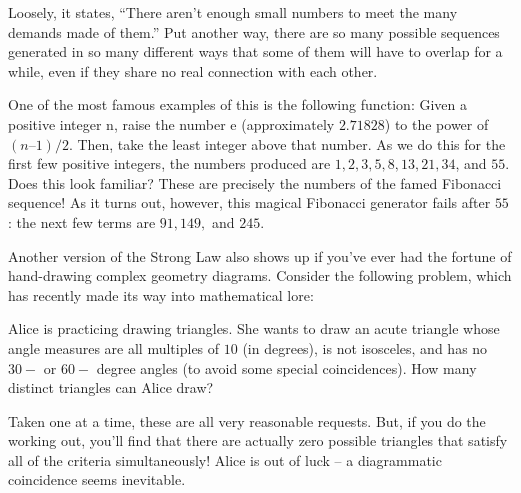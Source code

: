 \documentclass{article}
\begin{document}
Loosely, it states, “There aren’t enough small numbers to meet the many demands made of them.” Put another way, there are so many possible sequences generated in so many different ways that some of them will have to overlap for a while, even if they share no real connection with each other.
	
One of the most famous examples of this is the following function: Given a positive integer n, raise the number e (approximately $2.71828$) to the power of $(n – 1)/2$. Then, take the least integer above that number. As we do this for the first few positive integers, the numbers produced are $1, 2, 3, 5, 8, 13, 21, 34$, and $55$. Does this look familiar? These are precisely the numbers of the famed Fibonacci sequence! As it turns out, however, this magical Fibonacci generator fails after $55$: the next few terms are $91, 149,$ and $245$.

Another version of the Strong Law also shows up if you’ve ever had the fortune of hand-drawing complex geometry diagrams. Consider the following problem, which has recently made its way into mathematical lore:

Alice is practicing drawing triangles. She wants to draw an acute triangle whose angle measures are all multiples of $10$ (in degrees), is not isosceles, and has no $30-$ or $60-$ degree angles (to avoid some special coincidences). How many distinct triangles can Alice draw?
 
Taken one at a time, these are all very reasonable requests. But, if you do the working out, you’ll find that there are actually zero possible triangles that satisfy all of the criteria simultaneously! Alice is out of luck – a diagrammatic coincidence seems inevitable.
\end{document}
